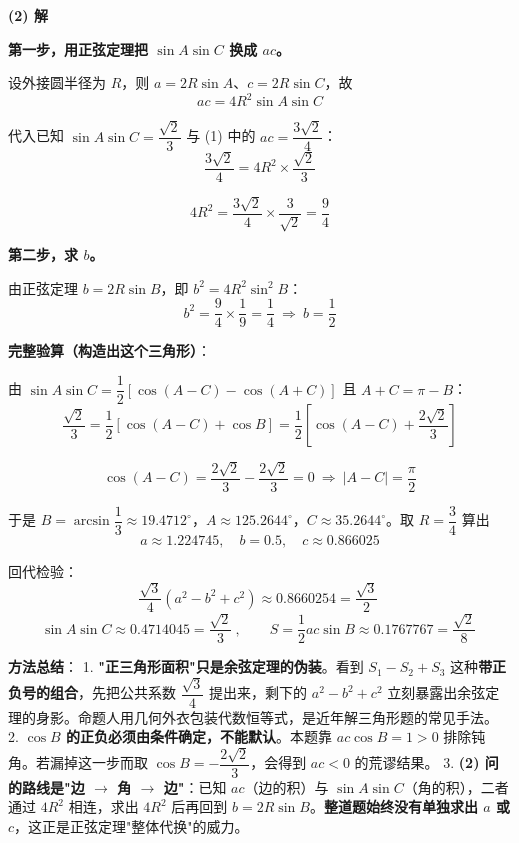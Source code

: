\begin{answer}
\par\medskip

\textbf{(2) 解}

\textbf{第一步，用正弦定理把 $\sin A\sin C$ 换成 $ac$。}

设外接圆半径为 $R$，则 $a=2R\sin A$、$c=2R\sin C$，故
\nopagebreak[4]
\[ac=4R^{2}\sin A\sin C\]

代入已知 $\sin A\sin C=\dfrac{\sqrt2}3$ 与 (1) 中的 $ac=\dfrac{3\sqrt2}4$：
\nopagebreak[4]
\[\frac{3\sqrt2}4=4R^{2}\times\frac{\sqrt2}3\]

\nopagebreak[4]
\[4R^{2}=\frac{3\sqrt2}4\times\frac3{\sqrt2}=\frac94\]

\textbf{第二步，求 $b$。}

由正弦定理 $b=2R\sin B$，即 $b^{2}=4R^{2}\sin^{2}B$：
\nopagebreak[4]
\[b^{2}=\frac94\times\frac19=\frac14\ \Longrightarrow\ b=\frac12\]

\textbf{完整验算（构造出这个三角形）}：

由 $\sin A\sin C=\dfrac12\left[\cos(A-C)-\cos(A+C)\right]$ 且 $A+C=\pi-B$：
\nopagebreak[4]
\[\frac{\sqrt2}3=\frac12\left[\cos(A-C)+\cos B\right]=\frac12\left[\cos(A-C)+\frac{2\sqrt2}3\right]\]

\nopagebreak[4]
\[\cos(A-C)=\frac{2\sqrt2}3-\frac{2\sqrt2}3=0\ \Longrightarrow\ |A-C|=\frac\pi2\]

于是 $B=\arcsin\dfrac13\approx19.4712^\circ$，$A\approx125.2644^\circ$，$C\approx35.2644^\circ$。取 $R=\dfrac34$ 算出
\nopagebreak[4]
\[a\approx1.224745,\quad b=0.5,\quad c\approx0.866025\]

回代检验：
\nopagebreak[4]
\[\frac{\sqrt3}4\left(a^{2}-b^{2}+c^{2}\right)\approx0.8660254=\frac{\sqrt3}2\ \]
\nopagebreak[4]
\[\sin A\sin C\approx0.4714045=\frac{\sqrt2}3\ ,\qquad S=\frac12ac\sin B\approx0.1767767=\frac{\sqrt2}8\ \]

\begin{gktip}
\textbf{方法总结}：
1. \textbf{"正三角形面积"只是余弦定理的伪装}。看到 $S_1-S_2+S_3$ 这种\textbf{带正负号的组合}，先把公共系数 $\dfrac{\sqrt3}4$ 提出来，剩下的 $a^{2}-b^{2}+c^{2}$ 立刻暴露出余弦定理的身影。命题人用几何外衣包装代数恒等式，是近年解三角形题的常见手法。
2. \textbf{$\cos B$ 的正负必须由条件确定，不能默认}。本题靠 $ac\cos B=1>0$ 排除钝角。若漏掉这一步而取 $\cos B=-\dfrac{2\sqrt2}3$，会得到 $ac<0$ 的荒谬结果。
3. \textbf{(2) 问的路线是"边 $\to$ 角 $\to$ 边"}：已知 $ac$（边的积）与 $\sin A\sin C$（角的积），二者通过 $4R^{2}$ 相连，求出 $4R^{2}$ 后再回到 $b=2R\sin B$。\textbf{整道题始终没有单独求出 $a$ 或 $c$}，这正是正弦定理"整体代换"的威力。
\end{gktip}



\par\medskip

\end{answer}
